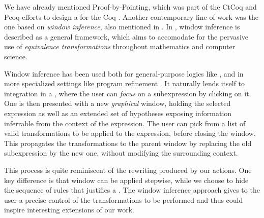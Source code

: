 We have already mentioned Proof-by-Pointing, which was part of the CtCoq and
Pcoq efforts  to design a  for the Coq . Another contemporary line of work was the
one based on \emph{window inference}, also mentioned in . In
, window inference is described as a general
 framework, which aims to accomodate for the pervasive use of
\emph{equivalence transformations} throughout mathematics and computer science.

Window inference has been used both for general-purpose logics like 
, and in more specialized settings like program
refinement . It naturally lends itself to
integration in a 
, where the user can
\emph{focus} on a subexpression by clicking on it. One is then presented with a
new \emph{graphical} window, holding the selected expression as well as an
extended set of hypotheses exposing information inferrable from the context of
the expression. The user can pick from a list of valid transformations to be
applied to the expression, before closing the window. This propagates the
transformations to the parent window by replacing the old subexpression by the
new one, without modifying the surrounding context.

This process is quite reminiscent of the rewriting produced by our 
actions. One key difference is that window  can be
applied stepwise, while we choose to hide the sequence of rules that
justifies a . The window inference approach gives to the user a
precise control of the transformations to be performed and thus could
inspire interesting extensions of our work.

